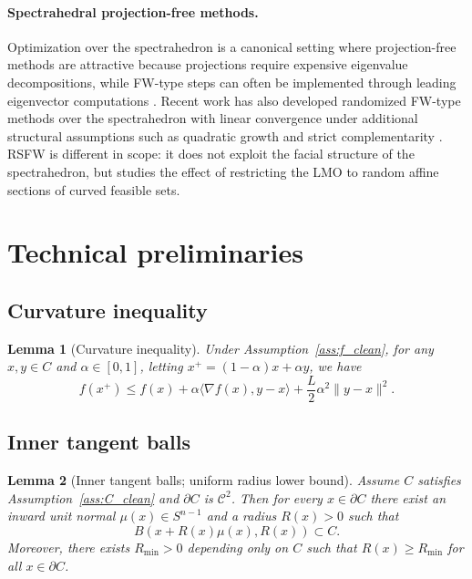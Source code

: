 \documentclass{article}
\newtheorem{lemma}{Lemma}
\begin{document}
\paragraph{Spectrahedral projection-free methods.}
Optimization over the spectrahedron is a canonical setting where projection-free
methods are attractive because projections require expensive eigenvalue
decompositions, while FW-type steps can often be implemented through leading
eigenvector computations \cite{Garber2016Spectrahedron}. Recent work has also
developed randomized FW-type methods over the spectrahedron with linear
convergence under additional structural assumptions such as quadratic growth and
strict complementarity \cite{Garber2026RandomizedSpectrahedron}. RSFW is
different in scope: it does not exploit the facial structure of the
spectrahedron, but studies the effect of restricting the LMO to random affine
sections of curved feasible sets.


\section{Technical preliminaries}
\label{app:preliminaries}

\subsection{Curvature inequality}

\begin{lemma}[Curvature inequality]
\label{lem:curvature_clean}
Under Assumption~\ref{ass:f_clean}, for any $x,y\in C$ and $\alpha\in[0,1]$, letting $x^+=(1-\alpha)x+\alpha y$, we have
\begin{equation}
f(x^+)\le f(x)+\alpha\langle \nabla f(x),y-x\rangle+\frac{L}{2}\alpha^2\|y-x\|^2.
\label{eq:curvineq_clean}
\end{equation}
\end{lemma}

\subsection{Inner tangent balls}

\begin{lemma}[Inner tangent balls; uniform radius lower bound]
\label{lem:tangentBalls_clean}
Assume $C$ satisfies Assumption~\ref{ass:C_clean} and $\partial C$ is $\mathcal{C}^2$.
Then for every $x\in\partial C$ there exist an inward unit normal $\mu(x)\in S^{n-1}$ and a radius $R(x)>0$ such that
\begin{equation}
B(x+R(x)\mu(x),R(x))\subset C.
\label{eq:tangentBall_clean}
\end{equation}
Moreover, there exists $R_{\min}>0$ depending only on $C$ such that $R(x)\ge R_{\min}$ for all $x\in\partial C$.
\end{lemma}
\end{document}

